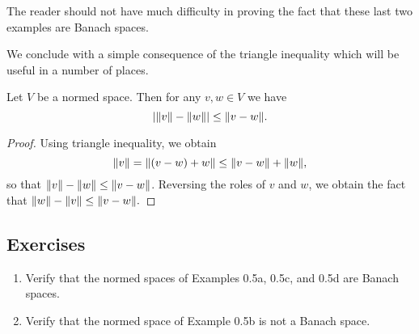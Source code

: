 The reader should not have much difficulty in proving the fact that these last two examples are Banach spaces.

We conclude with a simple consequence of the triangle inequality which will be useful in a number of places.

\begin{proposition}
Let $V$ be a normed space. Then for any $v,w\in V$ we have $$|\norm{v}-\norm{w}|\leq\norm{v-w}.$$
\end{proposition}

\begin{proof}
Using triangle inequality, we obtain $$\norm{v}=\norm{(v-w)+w}\leq\norm{v-w}+\norm{w},$$ so that $\norm{v}-\norm{w}\leq\norm{v-w}$. Reversing the roles of $v$ and $w$, we obtain the fact that $\norm{w}-\norm{v}\leq\norm{v-w}.$
\end{proof}

\subsection*{Exercises}
\begin{enumerate}[label=\arabic*)]
    \item Verify that the normed spaces of Examples 0.5a, 0.5c, and 0.5d are Banach spaces. %
    \item Verify that the normed space of Example 0.5b is not a Banach space. %
\end{enumerate}